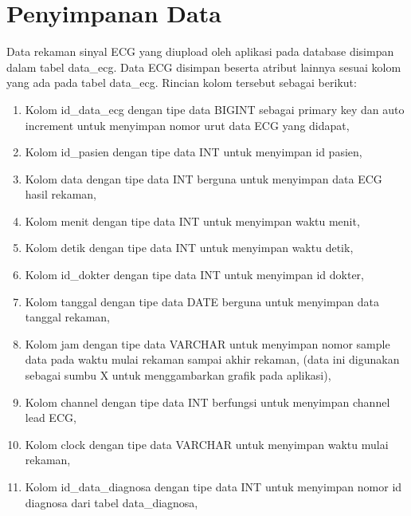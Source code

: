 \section{Penyimpanan Data}
\vspace{1ex}
Data rekaman sinyal  ECG yang diupload oleh aplikasi pada database disimpan dalam tabel data\_ecg. Data ECG disimpan beserta atribut lainnya sesuai kolom yang ada pada tabel data\_ecg. Rincian kolom tersebut sebagai berikut:
\begin{enumerate}
	\vspace{-2mm}
	\item Kolom id\_data\_ecg dengan tipe data BIGINT sebagai primary key dan auto increment untuk menyimpan nomor urut data ECG yang didapat,
	\vspace{-2mm}
	\item Kolom id\_pasien dengan tipe data INT untuk menyimpan id pasien,
	\vspace{-2mm}
	\item Kolom data dengan tipe data INT berguna untuk menyimpan data ECG hasil rekaman,
	\vspace{-2mm}
	\item Kolom menit dengan tipe data INT untuk menyimpan waktu menit,
	\vspace{-2mm}
	\item Kolom detik dengan tipe data INT untuk menyimpan waktu detik,
	\vspace{-2mm}
	\item Kolom id\_dokter dengan tipe data INT untuk menyimpan id dokter,
	\vspace{-2mm}
	\item Kolom tanggal dengan tipe data DATE berguna untuk menyimpan data tanggal rekaman,
	\vspace{-2mm}
	\item Kolom jam dengan tipe data VARCHAR untuk menyimpan nomor sample data pada waktu mulai rekaman sampai akhir rekaman, (data ini digunakan sebagai sumbu X untuk menggambarkan grafik pada aplikasi),
	\vspace{-2mm}
	\item Kolom channel dengan tipe data INT berfungsi untuk menyimpan channel lead ECG,
	\vspace{-2mm}
	\item Kolom clock dengan tipe data VARCHAR untuk menyimpan waktu mulai rekaman,
	\vspace{-2mm}
	\item Kolom id\_data\_diagnosa dengan tipe data INT untuk menyimpan nomor id diagnosa dari tabel data\_diagnosa,
\end{enumerate}


